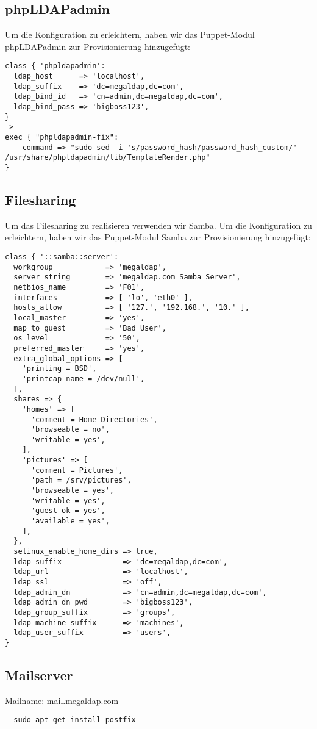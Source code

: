 \documentclass[main.tex]{subfiles}
\begin{document}
\subsection{phpLDAPadmin}
Um die Konfiguration zu erleichtern, haben wir das Puppet-Modul phpLDAPadmin zur 
Provisionierung hinzugefügt:

\begin{lstlisting}  
class { 'phpldapadmin':
  ldap_host      => 'localhost',
  ldap_suffix    => 'dc=megaldap,dc=com',
  ldap_bind_id   => 'cn=admin,dc=megaldap,dc=com',
  ldap_bind_pass => 'bigboss123',
}
->
exec { "phpldapadmin-fix":
    command => "sudo sed -i 's/password_hash/password_hash_custom/' /usr/share/phpldapadmin/lib/TemplateRender.php"
}
\end{lstlisting}

\newpage

\subsection{Filesharing}
Um das Filesharing zu realisieren verwenden wir Samba.
Um die Konfiguration zu erleichtern, haben wir das Puppet-Modul Samba zur
Provisionierung hinzugefügt:

\begin{lstlisting}
class { '::samba::server':
  workgroup            => 'megaldap',
  server_string        => 'megaldap.com Samba Server',
  netbios_name         => 'F01',
  interfaces           => [ 'lo', 'eth0' ],
  hosts_allow          => [ '127.', '192.168.', '10.' ],
  local_master         => 'yes',
  map_to_guest         => 'Bad User',
  os_level             => '50',
  preferred_master     => 'yes',
  extra_global_options => [
    'printing = BSD',
    'printcap name = /dev/null',
  ],
  shares => {
    'homes' => [
      'comment = Home Directories',
      'browseable = no',
      'writable = yes',
    ],
    'pictures' => [
      'comment = Pictures',
      'path = /srv/pictures',
      'browseable = yes',
      'writable = yes',
      'guest ok = yes',
      'available = yes',
    ],
  },
  selinux_enable_home_dirs => true,
  ldap_suffix              => 'dc=megaldap,dc=com',
  ldap_url                 => 'localhost',
  ldap_ssl                 => 'off',
  ldap_admin_dn            => 'cn=admin,dc=megaldap,dc=com',
  ldap_admin_dn_pwd        => 'bigboss123',
  ldap_group_suffix        => 'groups',
  ldap_machine_suffix      => 'machines',
  ldap_user_suffix         => 'users',
}
\end{lstlisting}

\subsection{Mailserver}

Mailname: mail.megaldap.com

\begin{lstlisting}
  sudo apt-get install postfix
\end{lstlisting}
\end{document}
